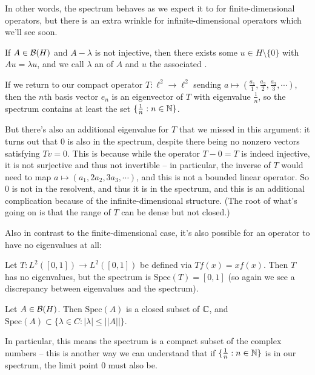 In other words, the spectrum behaves as we expect it to for finite-dimensional operators, but there is an extra wrinkle for infinite-dimensional operators which we'll see soon.

\begin{definition}
If $A \in \mathcal{B}(H)$ and $A - \lambda$ is not injective, then there exists some $u \in H \setminus \{0\}$ with $Au = \lambda u$, and we call $\lambda$ an  of $A$ and $u$ the associated .
\end{definition}

\begin{example}
If we return to our compact operator $T: \ell^2 \to \ell^2$ sending $a \mapsto (\frac{a_1}{1}, \frac{a_2}{2}, \frac{a_3}{3}, \cdots)$, then the $n$th basis vector $e_n$ is an eigenvector of $T$ with eigenvalue $\frac{1}{n}$, so the spectrum contains at least the set $\{\frac{1}{n}: n \in \mathbb N\}$.
\end{example}

But there's also an additional eigenvalue for $T$ that we missed in this argument: it turns out that $0$ is also in the spectrum, despite there being no nonzero vectors satisfying $Tv = 0$. This is because while the operator $T -0 = T$ is indeed injective, it is not surjective and thus not invertible -- in particular, the inverse of $T$ would need to map $a \mapsto (a_1, 2a_2, 3a_3, \cdots)$, and this is not a bounded linear operator. So $0$ is not in the resolvent, and thus it is in the spectrum, and this is an additional complication because of the infinite-dimensional structure. (The root of what's going on is that the range of $T$ can be dense but not closed.)
 
Also in contrast to the finite-dimensional case, it's also possible for an operator to have no eigenvalues at all:

\begin{example}
Let $T: L^2([0, 1]) \to L^2([0, 1])$ be defined via $Tf(x) = xf(x)$. Then $T$ has no eigenvalues, but the spectrum is $\text{Spec}(T) = [0, 1]$ (so again we see a discrepancy between eigenvalues and the spectrum). 
\end{example}

\begin{theorem}
Let $A \in \mathcal{B}(H)$. Then $\text{Spec}(A)$ is a closed subset of $\mathbb C$, and $\text{Spec}(A) \subset \{\lambda \in C: |\lambda| \le ||A||\}$.
\end{theorem}

In particular, this means the spectrum is a compact subset of the complex numbers -- this is another way we can understand that if $\{\frac{1}{n}: n \in \mathbb N\}$ is in our spectrum, the limit point $0$ must also be.

